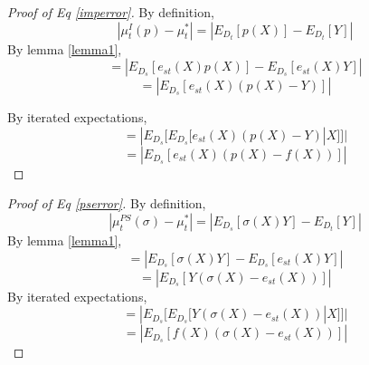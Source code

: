 \documentclass{article} %
\begin{document}
\begin{proof}[Proof of Eq \ref{imperror}]
By definition,
$$|\mu_t^{I}(p) - \mu_t^*|  = |E_{D_t}[p(X)]-E_{D_t}[Y]|$$
By lemma \ref{lemma1},
$$ = |E_{D_s}[e_{st}(X)p(X)]-E_{D_s}[e_{st}(X)Y]|$$
$$ = |E_{D_s}[e_{st}(X)(p(X)-Y)]|$$

By iterated expectations,
$$ = |E_{D_s}[E_{D_s}[e_{st}(X)(p(X)-Y)|X]]|$$
$$ =|E_{D_s}[e_{st}(X)\left(p(X) - f(X)\right)]|$$

\end{proof}

\begin{proof}[Proof of Eq \ref{pserror}]
By definition,
$$|\mu_t^{PS}(\sigma) - \mu_t^*| = |E_{D_s}[\sigma(X)Y]-E_{D_t}[Y]|$$
By lemma \ref{lemma1},
$$ = |E_{D_s}[\sigma(X)Y]-E_{D_s}[e_{st}(X)Y]|$$
$$ = |E_{D_s}[Y(\sigma(X)-e_{st}(X))]|$$
By iterated expectations,
$$ = |E_{D_s}[E_{D_s}[Y(\sigma(X)-e_{st}(X))|X]]|$$
$$ = |E_{D_s}[f(X)(\sigma(X)-e_{st}(X))]|$$

\end{proof}
\end{document}
